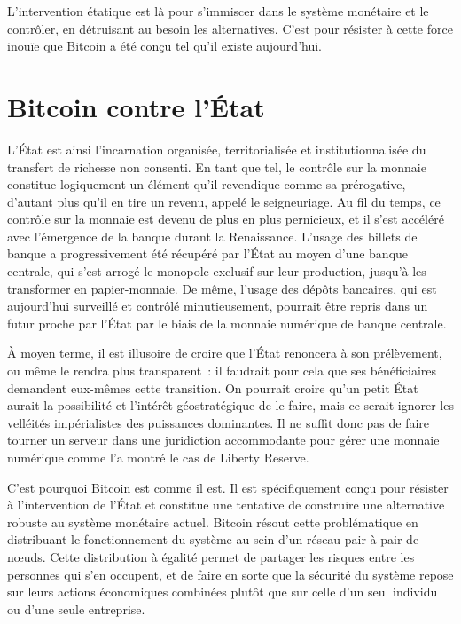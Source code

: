 L'intervention étatique est là pour s'immiscer dans le système monétaire et le contrôler, en détruisant au besoin les alternatives. C'est pour résister à cette force inouïe que Bitcoin a été conçu tel qu'il existe aujourd'hui.

\section*{Bitcoin contre l'État} %

L'État est ainsi l'incarnation organisée, territorialisée et institutionnalisée du transfert de richesse non consenti. En tant que tel, le contrôle sur la monnaie constitue logiquement un élément qu'il revendique comme sa prérogative, d'autant plus qu'il en tire un revenu, appelé le seigneuriage. Au fil du temps, ce contrôle sur la monnaie est devenu de plus en plus pernicieux, et il s'est accéléré avec l'émergence de la banque durant la Renaissance. L'usage des billets de banque a progressivement été récupéré par l'État au moyen d'une banque centrale, qui s'est arrogé le monopole exclusif sur leur production, jusqu'à les transformer en papier-monnaie. De même, l'usage des dépôts bancaires, qui est aujourd'hui surveillé et contrôlé minutieusement, pourrait être repris dans un futur proche par l'État par le biais de la monnaie numérique de banque centrale.

À moyen terme, il est illusoire de croire que l'État renoncera à son prélèvement, ou même le rendra plus transparent~: il faudrait pour cela que ses bénéficiaires demandent eux-mêmes cette transition. On pourrait croire qu'un petit État aurait la possibilité et l'intérêt géostratégique de le faire, mais ce serait ignorer les velléités impérialistes des puissances dominantes. Il ne suffit donc pas de faire tourner un serveur dans une juridiction accommodante pour gérer une monnaie numérique comme l'a montré le cas de Liberty Reserve.

C'est pourquoi Bitcoin est comme il est. Il est spécifiquement conçu pour résister à l'intervention de l'État et constitue une tentative de construire une alternative robuste au système monétaire actuel. Bitcoin résout cette problématique en distribuant le fonctionnement du système au sein d'un réseau pair-à-pair de nœuds. Cette distribution à égalité permet de partager les risques entre les personnes qui s'en occupent, et de faire en sorte que la sécurité du système repose sur leurs actions économiques combinées plutôt que sur celle d'un seul individu ou d'une seule entreprise. %
